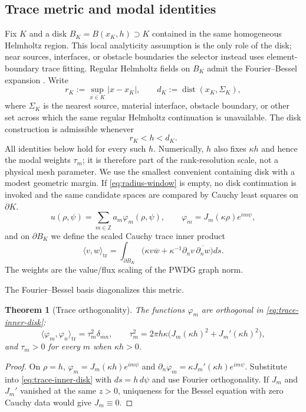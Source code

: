 \documentclass[11pt]{article}
\newtheorem{theorem}{Theorem}[section]
\newcommand{\ii}{i}
\numberwithin{equation}{section}
\begin{document}
\subsection{Trace metric and modal identities}
Fix $K$ and a disk $B_K=B(x_K,h)\supset K$ contained in the same homogeneous Helmholtz region.  This local analyticity assumption is the only role of the disk; near sources, interfaces, or obstacle boundaries the selector instead uses element-boundary trace fitting.  Regular Helmholtz fields on $B_K$ admit the Fourier--Bessel expansion \citep{Watson1944,MoiolaHiptmairPerugia2011}.
Write
\begin{equation}\label{eq:radius-admissible}
 r_K:=\sup_{x\in K}|x-x_K|,\qquad
 d_K:=\operatorname{dist}(x_K,\Sigma_K),
\end{equation}
where $\Sigma_K$ is the nearest source, material interface, obstacle boundary, or other set across which the same regular Helmholtz continuation is unavailable.  The disk construction is admissible whenever
\begin{equation}\label{eq:radius-window}
 r_K<h<d_K.
\end{equation}
All identities below hold for every such $h$.  Numerically, $h$ also fixes $\kappa h$ and hence the modal weights $\tau_m$; it is therefore part of the rank-resolution scale, not a physical mesh parameter.  We use the smallest convenient containing disk with a modest geometric margin.  If \eqref{eq:radius-window} is empty, no disk continuation is invoked and the same candidate spaces are compared by Cauchy least squares on $\partial K$.
\begin{equation}\label{eq:FBexpansion}
 u(\rho,\psi)=\sum_{m\in\mathbb Z}a_m\varphi_m(\rho,\psi),\qquad
 \varphi_m=J_m(\kappa\rho)e^{\ii m\psi},
\end{equation}
and on $\partial B_K$ we define the scaled Cauchy trace inner product
\begin{equation}\label{eq:trace-inner-disk}
 \langle v,w\rangle_{\mathrm{tr}}
 =\int_{\partial B_K}\big(\kappa v\overline w+\kappa^{-1}\partial_nv\,\overline{\partial_nw}\big)ds.
\end{equation}
The weights are the value/flux scaling of the PWDG graph norm.

The Fourier--Bessel basis diagonalizes this metric.
\begin{theorem}[Trace orthogonality]\label{thm:T1}
The functions $\varphi_m$ are orthogonal in \eqref{eq:trace-inner-disk}:
\begin{equation}\label{eq:T1}
 \langle\varphi_m,\varphi_n\rangle_{\mathrm{tr}}=\tau_m^2\delta_{mn},\qquad
 \tau_m^2=2\pi h\kappa\big(J_m(\kappa h)^2+J_m'(\kappa h)^2\big),
\end{equation}
and $\tau_m>0$ for every $m$ when $\kappa h>0$.
\end{theorem}
\begin{proof}
On $\rho=h$, $\varphi_m=J_m(\kappa h)e^{\ii m\psi}$ and $\partial_n\varphi_m=\kappa J_m'(\kappa h)e^{\ii m\psi}$.  Substitute into \eqref{eq:trace-inner-disk} with $ds=h\,d\psi$ and use Fourier orthogonality.  If $J_m$ and $J_m'$ vanished at the same $z>0$, uniqueness for the Bessel equation with zero Cauchy data would give $J_m\equiv0$.
\end{proof}
\end{document}
